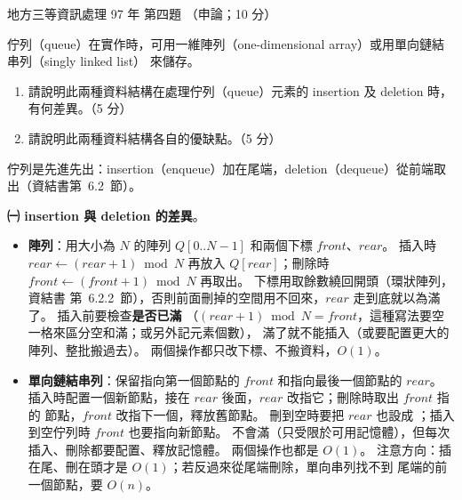 \begin{pastexam}[label={px:df3-097-ds-04}]{地方三等資訊處理 97 年 第四題}
（申論；10 分）

佇列（queue）在實作時，可用一維陣列（one-dimensional array）或用單向鏈結串列（singly linked list）
來儲存。
\begin{enumerate}[leftmargin=2.6em, labelsep=0.4em]
\item[㈠] 請說明此兩種資料結構在處理佇列（queue）元素的 insertion 及 deletion 時，有何差異。（5 分）
\item[㈡] 請說明此兩種資料結構各自的優缺點。（5 分）
\end{enumerate}
\end{pastexam}

\begin{pastsoln}
佇列是先進先出：insertion（enqueue）加在尾端，deletion（dequeue）從前端取出（資結書第~6.2~節）。

\textbf{㈠ insertion 與 deletion 的差異}。
\begin{itemize}
\item \textbf{陣列}：用大小為 $N$ 的陣列 $Q[0..N-1]$ 和兩個下標 $\mathit{front}$、$\mathit{rear}$。 插入時
$\mathit{rear} \gets (\mathit{rear} + 1) \bmod N$ 再放入 $Q[\mathit{rear}]$；刪除時
$\mathit{front} \gets (\mathit{front} + 1) \bmod N$ 再取出。 下標用取餘數繞回開頭（環狀陣列，資結書
第~6.2.2~節），否則前面刪掉的空間用不回來，$\mathit{rear}$ 走到底就以為滿了。 插入前要檢查\textbf{是否已滿}
（$(\mathit{rear} + 1) \bmod N = \mathit{front}$，這種寫法要空一格來區分空和滿；或另外記元素個數），
滿了就不能插入（或要配置更大的陣列、整批搬過去）。 兩個操作都只改下標、不搬資料，$O(1)$。
\item \textbf{單向鏈結串列}：保留指向第一個節點的 $\mathit{front}$ 和指向最後一個節點的 $\mathit{rear}$。
插入時配置一個新節點，接在 $\mathit{rear}$ 後面，$\mathit{rear}$ 改指它；刪除時取出 $\mathit{front}$ 指的
節點，$\mathit{front}$ 改指下一個，釋放舊節點。 刪到空時要把 $\mathit{rear}$ 也設成 \NIL；插入到空佇列時
$\mathit{front}$ 也要指向新節點。 不會滿（只受限於可用記憶體），但每次插入、刪除都要配置、釋放記憶體。
兩個操作也都是 $O(1)$。 注意方向：插在尾、刪在頭才是 $O(1)$；若反過來從尾端刪除，單向串列找不到
尾端的前一個節點，要 $O(n)$。
\end{itemize}


\end{pastsoln}
